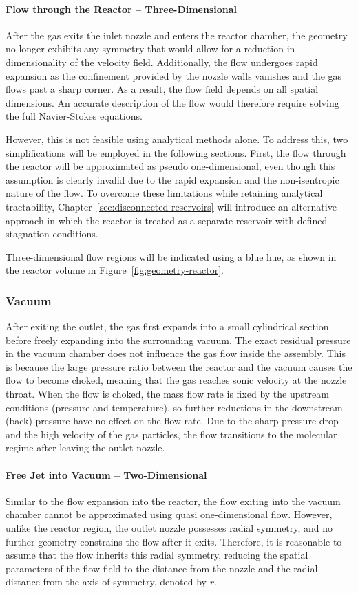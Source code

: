 	\paragraph*{Flow through the Reactor -- Three-Dimensional}
		After the gas exits the inlet nozzle and enters the reactor chamber, the geometry no longer exhibits any symmetry that would allow for a reduction in dimensionality of the velocity field.
		Additionally, the flow undergoes rapid expansion as the confinement provided by the nozzle walls vanishes and the gas flows past a sharp corner.
		As a result, the flow field depends on all spatial dimensions.
		An accurate description of the flow would therefore require solving the full Navier-Stokes equations.

		However, this is not feasible using analytical methods alone.
		To address this, two simplifications will be employed in the following sections.
		First, the flow through the reactor will be approximated as pseudo one-dimensional, even though this assumption is clearly invalid due to the rapid expansion and the non-isentropic nature of the flow.
		To overcome these limitations while retaining analytical tractability, Chapter~\ref{sec:disconnected-reservoirs} will introduce an alternative approach in which the reactor is treated as a separate reservoir with defined stagnation conditions.

		Three-dimensional flow regions will be indicated using a blue hue, as shown in the reactor volume in Figure~\ref{fig:geometry-reactor}.

\subsubsection*{Vacuum}
	After exiting the outlet, the gas first expands into a small cylindrical section before freely expanding into the surrounding vacuum.
	The exact residual pressure in the vacuum chamber does not influence the gas flow inside the assembly.
	This is because the large pressure ratio between the reactor and the vacuum causes the flow to become choked, meaning that the gas reaches sonic velocity at the nozzle throat.
	When the flow is choked, the mass flow rate is fixed by the upstream conditions (pressure and temperature), so further reductions in the downstream (back) pressure have no effect on the flow rate.
	Due to the sharp pressure drop and the high velocity of the gas particles, the flow transitions to the molecular regime after leaving the outlet nozzle.

	\paragraph{Free Jet into Vacuum -- Two-Dimensional}
		Similar to the flow expansion into the reactor, the flow exiting into the vacuum chamber cannot be approximated using quasi one-dimensional flow.
		However, unlike the reactor region, the outlet nozzle possesses radial symmetry, and no further geometry constrains the flow after it exits.
		Therefore, it is reasonable to assume that the flow inherits this radial symmetry, reducing the spatial parameters of the flow field to the distance from the nozzle and the radial distance from the axis of symmetry, denoted by $r$.

